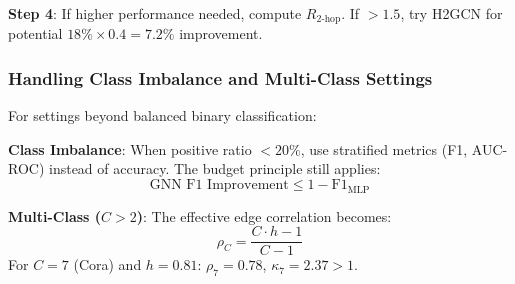 \textbf{Step 4}: If higher performance needed, compute $R_{2\text{-hop}}$. If $> 1.5$, try H2GCN for potential $18\% \times 0.4 = 7.2\%$ improvement.

\subsubsection{Handling Class Imbalance and Multi-Class Settings}

For settings beyond balanced binary classification:

\textbf{Class Imbalance}: When positive ratio $< 20\%$, use stratified metrics (F1, AUC-ROC) instead of accuracy. The budget principle still applies:
\begin{equation}
\text{GNN F1 Improvement} \leq 1 - \text{F1}_{\text{MLP}}
\end{equation}

\textbf{Multi-Class ($C > 2$)}: The effective edge correlation becomes:
\begin{equation}
\rho_C = \frac{C \cdot h - 1}{C - 1}
\end{equation}
For $C = 7$ (Cora) and $h = 0.81$: $\rho_7 = 0.78$, $\kappa_7 = 2.37 > 1$.
